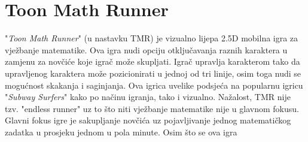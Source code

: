 \documentclass[times, utf8, zavrsni, numeric]{fer}
\begin{document}
	\section{Toon Math Runner} 
	"\textit{Toon Math Runner}"\cite{toon} (u nastavku TMR) je vizualno lijepa 2.5D mobilna igra za vježbanje matematike. Ova igra nudi opciju otključavanja raznih karaktera u zamjenu za novčiće koje igrač može skupljati. Igrač upravlja karakterom
		tako da upravljenog karaktera može pozicionirati u jednoj od tri linije, osim toga nudi se mogućnost skakanja i saginjanja. Ova igrica uvelike podsjeća na popularnu igricu "\textit{Subway Surfers}" kako po načinu igranja, tako i vizualno.
	 Nažalost, TMR nije tzv. "endless runner" uz to što niti vježbanje matematike nije u glavnom fokusu. Glavni fokus igre je sakupljanje novčića uz pojavljivanje jednog matematičkog zadatka u prosjeku jednom u pola minute. Osim što se ova igra 
\end{document}
